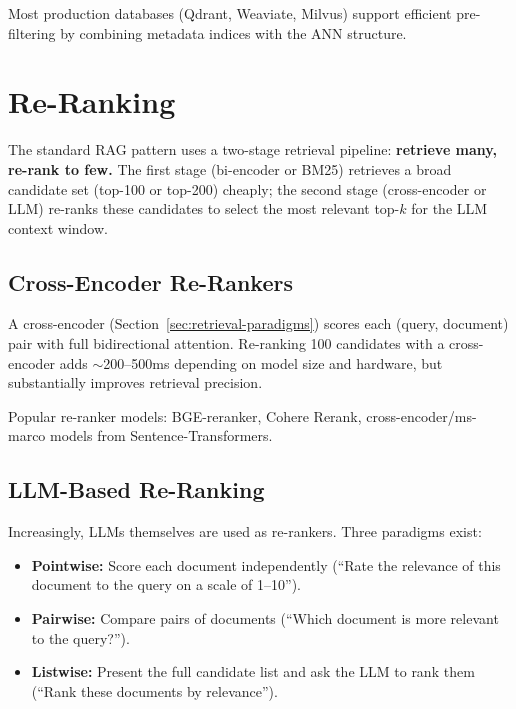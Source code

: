 Most production databases (Qdrant, Weaviate, Milvus) support efficient
pre-filtering by combining metadata indices with the ANN structure.


\section{Re-Ranking}
\label{sec:reranking}

The standard RAG pattern uses a two-stage retrieval pipeline:
\textbf{retrieve many, re-rank to few.}  The first stage (bi-encoder or BM25)
retrieves a broad candidate set (top-100 or top-200) cheaply; the second stage
(cross-encoder or LLM) re-ranks these candidates to select the most relevant
top-$k$ for the LLM context window.

\subsection{Cross-Encoder Re-Rankers}

A cross-encoder (Section~\ref{sec:retrieval-paradigms}) scores each
(query, document) pair with full bidirectional attention.  Re-ranking 100
candidates with a cross-encoder adds $\sim$200--500ms depending on model size
and hardware, but substantially improves retrieval precision.

Popular re-ranker models: BGE-reranker, Cohere Rerank, cross-encoder/ms-marco
models from Sentence-Transformers.

\subsection{LLM-Based Re-Ranking}

Increasingly, LLMs themselves are used as re-rankers.  Three paradigms exist:

\begin{itemize}
    \item \textbf{Pointwise:} Score each document independently (``Rate the
          relevance of this document to the query on a scale of 1--10'').
    \item \textbf{Pairwise:} Compare pairs of documents (``Which document is
          more relevant to the query?'').
    \item \textbf{Listwise:} Present the full candidate list and ask the LLM
          to rank them (``Rank these documents by relevance'').
\end{itemize}

